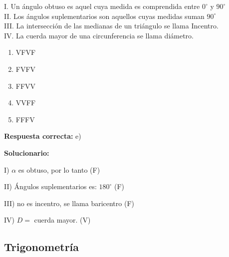 \begin{enumerate}[resume]
	I. Un ángulo obtuso es aquel cuya medida es comprendida entre $0^\circ$ y $90^\circ$\\
	II. Los ángulos suplementarios son aquellos cuyas medidas suman $90^\circ$\\
	III. La intersección de las medianas de un triángulo se llama Incentro.\\
	IV. La cuerda mayor de una circunferencia se llama diámetro.
	
	\begin{enumerate}[label=\alph*)]
		\item VFVF
		\item FVFV
		\item FFVV
		\item VVFF
		\item FFFV
	\end{enumerate}
	\textbf{Respuesta correcta:} e)
	
	\vspace{2mm}
	\textbf{Solucionario:}
	
	I) $\alpha$ es obtuso, por lo tanto \hfill (F)
	
	II) Ángulos suplementarios es: $180^\circ$ \hfill (F)
	
	III) no es incentro, se llama baricentro \hfill (F)
	
	IV) $D=$ cuerda mayor. \hfill (V)
	
	\vspace{6mm}
	
\end{enumerate}




\subsection*{Trigonometría}

